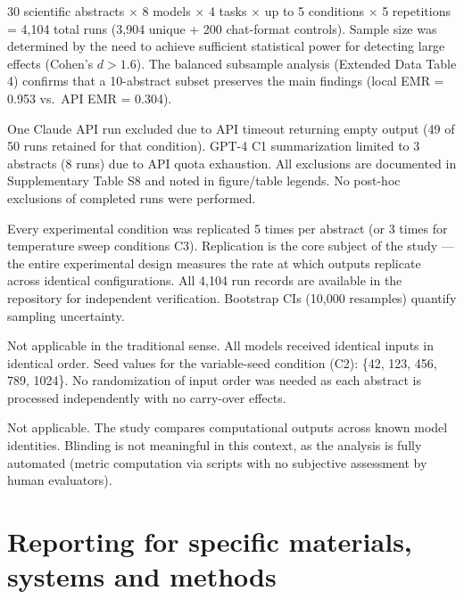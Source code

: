 \documentclass[11pt]{article}
\begin{document}
\begin{description}[leftmargin=2em,style=nextline]
\item[Sample size] 30 scientific abstracts $\times$ 8 models $\times$ 4 tasks $\times$ up to 5 conditions $\times$ 5 repetitions = 4,104 total runs (3,904 unique + 200 chat-format controls). Sample size was determined by the need to achieve sufficient statistical power for detecting large effects (Cohen's $d > 1.6$). The balanced subsample analysis (Extended Data Table 4) confirms that a 10-abstract subset preserves the main findings (local EMR = 0.953 vs.\ API EMR = 0.304).

\item[Data exclusions] One Claude API run excluded due to API timeout returning empty output (49 of 50 runs retained for that condition). GPT-4 C1 summarization limited to 3 abstracts (8 runs) due to API quota exhaustion. All exclusions are documented in Supplementary Table S8 and noted in figure/table legends. No post-hoc exclusions of completed runs were performed.

\item[Replication] Every experimental condition was replicated 5 times per abstract (or 3 times for temperature sweep conditions C3). Replication is the core subject of the study --- the entire experimental design measures the rate at which outputs replicate across identical configurations. All 4,104 run records are available in the repository for independent verification. Bootstrap CIs (10,000 resamples) quantify sampling uncertainty.

\item[Randomization] Not applicable in the traditional sense. All models received identical inputs in identical order. Seed values for the variable-seed condition (C2): \{42, 123, 456, 789, 1024\}. No randomization of input order was needed as each abstract is processed independently with no carry-over effects.

\item[Blinding] Not applicable. The study compares computational outputs across known model identities. Blinding is not meaningful in this context, as the analysis is fully automated (metric computation via scripts with no subjective assessment by human evaluators).
\end{description}

\section*{Reporting for specific materials, systems and methods}
\end{document}
